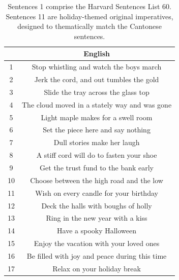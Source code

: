 \begin{table}[!htbp]
\begin{center}

\begin{tabular}{c c}
\toprule
 & \textbf{English} \\
 \midrule
1 & Stop whistling and watch the boys march \\ 
2 & Jerk the cord, and out tumbles the gold \\ 
3 & Slide the tray across the glass top \\ 
4 & The cloud moved in a stately way and was gone \\ 
5 & Light maple makes for a swell room \\ 
6 & Set the piece here and say nothing \\ 
7 & Dull stories make her laugh \\ 
8 & A stiff cord will do to fasten your shoe \\ 
9 & Get the trust fund to the bank early \\ 
10 & Choose between the high road and the low \\ 
11 & Wish on every candle for your birthday \\ 
12 & Deck the halls with boughs of holly \\ 
13 & Ring in the new year with a kiss \\ 
14 & Have a spooky Halloween \\ 
15 & Enjoy the vacation with your loved ones \\ 
16 & Be filled with joy and peace during this time \\ 
17 & Relax on your holiday break \\ 
\bottomrule

\end{tabular}
\caption{Sentences 1 comprise the Harvard Sentences List 60. Sentences 11 are holiday-themed original imperatives, designed to thematically match the Cantonese sentences.}
\label{ch2:tab:eng_sent}
\end{center}
\end{table}

